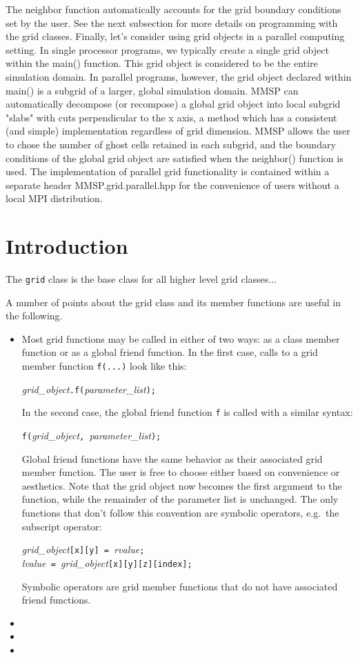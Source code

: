 The neighbor function automatically accounts for the grid boundary conditions set by the user. See the next subsection for more details on programming with the grid classes. 
Finally, let's consider using grid objects in a parallel computing setting. In single processor programs, we typically create a single grid object within the main() function. This grid object is considered to be the entire simulation domain. In parallel programs, however, the grid object declared within main() is a subgrid of a larger, global simulation domain. MMSP can automatically decompose (or recompose) a global grid object into local subgrid "slabs" with cuts perpendicular to the x axis, a method which has a consistent (and simple) implementation regardless of grid dimension. MMSP allows the user to chose the number of ghost cells retained in each subgrid, and the boundary conditions of the global grid object are satisfied when the neighbor() function is used. The implementation of parallel grid functionality is contained within a separate header MMSP.grid.parallel.hpp for the convenience of users without a local MPI distribution. 

\section{Introduction}
The {\tt grid} class is the base class for all higher level grid classes...

A number of points about the grid class and its member functions are useful in the following.
\begin{itemize}
\item Most grid functions may be called in either of two ways: as a class member function or as a global friend function.  In the first case, calls to a grid member function {\tt f(...)} look like this:
\begin{center}
{\it grid\_object}{\tt .f(}{\it parameter\_list}{\tt );}
\end{center}
In the second case, the global friend function {\tt f} is called with a similar syntax:
\begin{center}
{\tt f(}{\it grid\_object}{\tt, }{\it parameter\_list}{\tt );}
\end{center}
Global friend functions have the same behavior as their associated grid member function.  The user is free to choose either based on convenience or aesthetics.  Note that the grid object now becomes the first argument to the function, while the remainder of the parameter list is unchanged.  The only functions that don't follow this convention are symbolic operators, e.g.\ the subscript operator: 
\begin{center}
{\it grid\_object}{\tt[x][y] = }{\it rvalue}{\tt;}\\
{\it lvalue}{\tt { }= }{\it grid\_object}{\tt[x][y][z][index];}
\end{center}
Symbolic operators are grid member functions that do not have associated friend functions.
\item 
\item 
\item 
\end{itemize}



